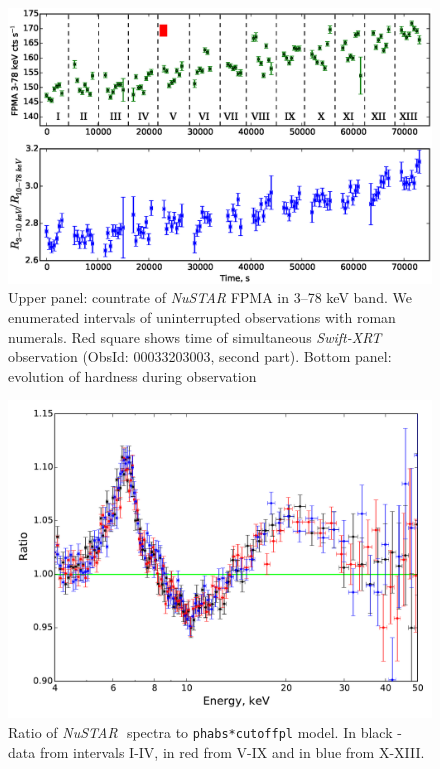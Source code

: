 \documentclass[a4paper,fleqn,usenatbib]{mnras}
\def\swiftx{{\em Swift-XRT\,}}
\def\nustar{{\em NuSTAR\,}}
\begin{document}
\begin{figure}
\centerline{\includegraphics[scale=0.7]{nuAlc_color_v04.eps}}
\caption{Upper panel: countrate of \nustar\,FPMA in 3--78 keV band. We enumerated intervals of uninterrupted observations with roman numerals. Red square shows time of simultaneous \swiftx observation (ObsId: 00033203003, second part). Bottom panel: evolution of hardness during observation} 
\label{fig:nust_lc}
\end{figure} 
 \begin{figure}
\centerline{\includegraphics[width=\linewidth]{ratios_v01.pdf}}
\caption{Ratio of \nustar\, spectra to \texttt{phabs*cutoffpl} model. In black - data from intervals I-IV, in red from V-IX and in blue from X-XIII.} 
\label{fig:ratios}
\end{figure}  
\end{document}
